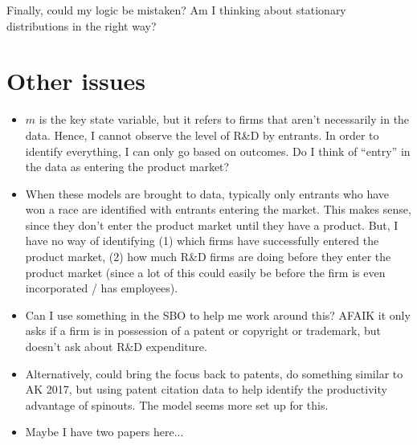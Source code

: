 \documentclass[12pt,english]{article}
\theoremstyle{remark}
\begin{document}
Finally, could my logic be mistaken? Am I thinking about stationary distributions in the right way? 






\section{Other issues}

\begin{itemize}
	\item $m$ is the key state variable, but it refers to firms that aren't necessarily in the data. Hence, I cannot observe the level of R\&D by entrants. In order to identify everything, I can only go based on outcomes. Do I think of ``entry'' in the data as entering the product market? 
	\item When these models are brought to data, typically only entrants who have won a race are identified with entrants entering the market. This makes sense, since they don't enter the product market until they have a product. But, I have no way of identifying (1) which firms have successfully entered the product market, (2) how much R\&D firms are doing before they enter the product market (since a lot of this could easily be before the firm is even incorporated / has employees). 
	\item Can I use something in the SBO to help me work around this? AFAIK it only asks if a firm is in possession of a patent or copyright or trademark, but doesn't ask about R\&D expenditure.
	\item Alternatively, could bring the focus back to patents, do something similar to AK 2017, but using patent citation data to help identify the productivity advantage of spinouts. The model seems more set up for this.
	\item Maybe I have two papers here...
\end{itemize}
\end{document}
